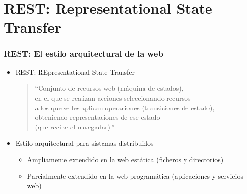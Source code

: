%

\section{REST: Representational State Transfer}







\begin{frame}
\frametitle{REST: El estilo arquitectural de la web}

\begin{itemize}
\item REST: REpresentational State Transfer

  \begin{quote}
  ``Conjunto de recursos web (máquina de estados), \\
  en el que se realizan acciones seleccionando recursos \\
  a los que se les aplican operaciones (transiciones de estado), \\
  obteniendo representaciones de ese estado \\
  (que recibe el navegador).''
  \end{quote}
  
\item Estilo arquitectural para sistemas distribuidos
  \begin{itemize}
  \item Ampliamente extendido en la web estática (ficheros y directorios)
  \item Parcialmente extendido en la web programática (aplicaciones y servicios web)
  \end{itemize}
\end{itemize}

\end{frame}

